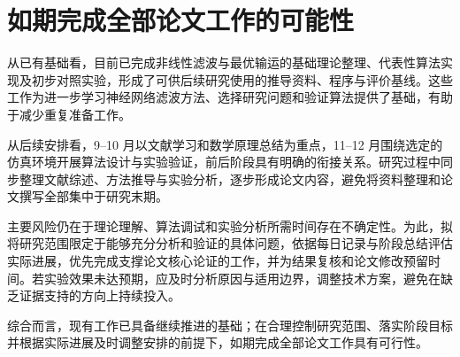 \section{如期完成全部论文工作的可能性}

从已有基础看，目前已完成非线性滤波与最优输运的基础理论整理、代表性算法实现及初步对照实验，形成了可供后续研究使用的推导资料、程序与评价基线。这些工作为进一步学习神经网络滤波方法、选择研究问题和验证算法提供了基础，有助于减少重复准备工作。

从后续安排看，9--10 月以文献学习和数学原理总结为重点，11--12 月围绕选定的仿真环境开展算法设计与实验验证，前后阶段具有明确的衔接关系。研究过程中同步整理文献综述、方法推导与实验分析，逐步形成论文内容，避免将资料整理和论文撰写全部集中于研究末期。

主要风险仍在于理论理解、算法调试和实验分析所需时间存在不确定性。为此，拟将研究范围限定于能够充分分析和验证的具体问题，依据每日记录与阶段总结评估实际进展，优先完成支撑论文核心论证的工作，并为结果复核和论文修改预留时间。若实验效果未达预期，应及时分析原因与适用边界，调整技术方案，避免在缺乏证据支持的方向上持续投入。

综合而言，现有工作已具备继续推进的基础；在合理控制研究范围、落实阶段目标并根据实际进展及时调整安排的前提下，如期完成全部论文工作具有可行性。
